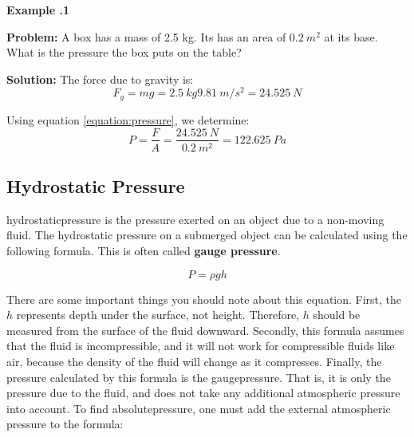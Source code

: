 	\begin{mdframed}[backgroundcolor=blue!10!white]
	\begin{center}
		
		
		\textbf{Example \thesection.1}	
	\end{center}
	
	\textbf{Problem: } A box has a mass of 2.5 kg.  Its has an area of $\SI{0.2}{m^2}$ at its base.  What is the pressure the box puts on the table?   
	\vspace{0.1in}
	
	\textbf{Solution:} The force due to gravity is:
	\begin{equation*}
		F_g = mg = \SI{2.5}{kg} \SI{9.81}{m/s^2}  = \SI{24.525}{N} 
	\end{equation*}

Using equation \ref{equation:pressure}, we determine:
\begin{equation*}
	P = \frac{F}{A} = \frac{\SI{24.525}{N}}{\SI{0.2}{m^2}} =  \SI{122.625}{Pa}
\end{equation*}
	
	
	
	
\end{mdframed}
\vspace{0.1in}



		\subsection{Hydrostatic Pressure}
		\gls{hydrostaticpressure} is the pressure exerted on an object due to a non-moving fluid.  The hydrostatic pressure on a submerged object can be calculated using the following formula.  This is often called \textbf{gauge pressure}. 
		

				\begin{mdframed}[backgroundcolor=orange!20!white]
		\begin{equation}
			P = \rho g h
			\label{equation:hydrostaticpressure}
		\end{equation}
	\end{mdframed}	

There are some important things you should note about this equation.  First, the $h$ represents depth under the surface, not height. Therefore, $h$ should be measured from the surface of the fluid downward.  Secondly, this formula assumes that the fluid is incompressible, and it will not work for compressible fluids like air, because the density of the fluid will change as it compresses.  Finally, the pressure calculated by this formula is the \gls{gaugepressure}.  That is, it is only the pressure due to the fluid, and does not take any additional atmospheric pressure into account.  To find \gls{absolutepressure}, one must add the external atmospheric pressure to the formula:


